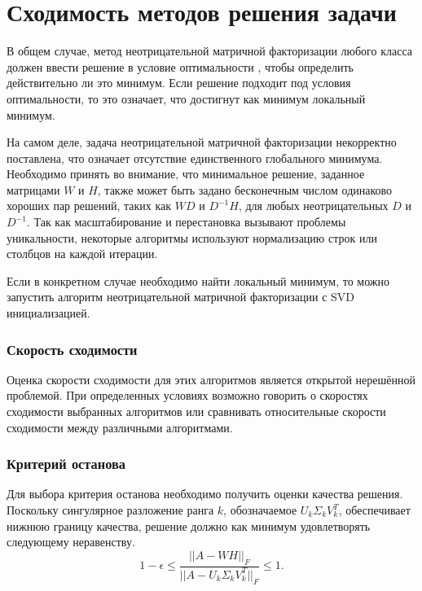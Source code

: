 \newpage





\section{Сходимость методов решения задачи}

В общем случае, метод неотрицательной матричной факторизации любого класса
должен ввести решение в условие оптимальности \cite{chu},
чтобы определить действительно ли это минимум.
Если решение подходит под условия оптимальности, то это означает, что достигнут как минимум локальный минимум.

На самом деле, задача неотрицательной матричной факторизации некорректно поставлена,
что означает отсутствие единственного глобального минимума.
Необходимо принять во внимание, что минимальное решение, заданное матрицами $W$ и $H$,
также может быть задано бесконечным числом одинаково хороших пар решений,
таких как $WD$ и $D^{-1}H$, для любых неотрицательных $D$ и $D^{−1}$.
Так как масштабирование и перестановка вызывают проблемы уникальности,
некоторые алгоритмы используют нормализацию строк или столбцов на каждой итерации.

Если в конкретном случае необходимо найти  локальный минимум,
то можно запустить алгоритм неотрицательной матричной факторизации с SVD инициализацией.

\subsubsection{Скорость сходимости}

Оценка скорости сходимости для этих алгоритмов является открытой нерешённой проблемой.
При определенных условиях возможно говорить о скоростях сходимости выбранных алгоритмов
или сравнивать относительные скорости сходимости между различными алгоритмами.

\subsubsection{Критерий останова}

Для выбора критерия останова необходимо получить оценки качества решения.
Поскольку сингулярное разложение ранга $k$, обозначаемое $U_k \Sigma_k V_k^T$,
обеспечивает нижнюю границу качества, решение должно как минимум удовлетворять следующему неравенству.
\begin{equation*}
  1 - \epsilon \leq \frac{||A - WH||_F}{||A - U_k \Sigma_k V_k^T||_F} \leq 1.
\end{equation*}

